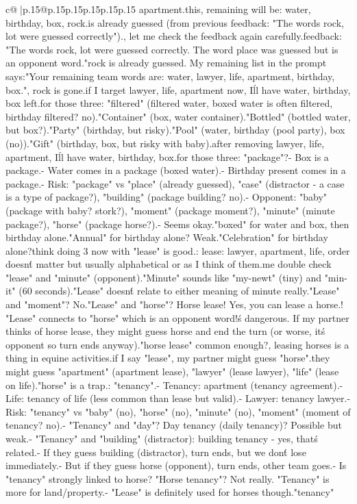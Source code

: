 \documentclass{article}
\begin{document}
{\begin{supertabular}{c@{$\;$}|p{.15\linewidth}@{}p{.15\linewidth}p{.15\linewidth}p{.15\linewidth}p{.15\linewidth}p{.15\linewidth}}
{{{apartment.\n\nAfter this, remaining will be: water, birthday, box, rock.\nRock is already guessed (from previous feedback: "The words rock, lot were guessed correctly").\nWait, let me check the feedback again carefully.\n\nPrevious feedback: "The words rock, lot were guessed correctly. The word place was guessed but is an opponent word."\n\nSo rock is already guessed. My remaining list in the prompt says:\n"Your remaining team words are: water, lawyer, life, apartment, birthday, box."\n\nYes, rock is gone.\n\nSo if I target lawyer, life, apartment now, I\'ll have water, birthday, box left.\n\nThen for those three: "filtered" (filtered water, boxed water is often filtered, birthday filtered? no).\n"Container" (box, water container).\n"Bottled" (bottled water, but box?).\n"Party" (birthday, but risky).\n"Pool" (water, birthday (pool party), box (no)).\n"Gift" (birthday, box, but risky with baby).\n\nActually after removing lawyer, life, apartment, I\'ll have water, birthday, box.\n\nClue for those three: "package"?\n- Box is a package.\n- Water comes in a package (boxed water).\n- Birthday present comes in a package.\n- Risk: "package" vs "place" (already guessed), "case" (distractor - a case is a type of package?), "building" (package building? no).\n- Opponent: "baby" (package with baby? stork?), "moment" (package moment?), "minute" (minute package?), "horse" (package horse?).\n- Seems okay.\n\nOr "boxed" for water and box, then birthday alone.\n"Annual" for birthday alone? Weak.\n\n"Celebration" for birthday alone?\n\nI think doing 3 now with "lease" is good.\n\nCLUE: lease\nTARGETS: lawyer, apartment, life\n\nWait, order doesn\'t matter but usually alphabetical or as I think of them.\n\nLet me double check "lease" and "minute" (opponent).\n"Minute" sounds like "my-newt" (tiny) and "min-it" (60 seconds).\n"Lease" doesn\'t relate to either meaning of minute really.\n\n"Lease" and "moment"? No.\n\n"Lease" and "horse"? Horse lease! Yes, you can lease a horse.\nOh! "Lease" connects to "horse" which is an opponent word!\nThat\'s dangerous. If my partner thinks of horse lease, they might guess horse and end the turn (or worse, it\'s opponent so turn ends anyway).\n\nIs "horse lease" common enough?\nYes, leasing horses is a thing in equine activities.\nSo if I say "lease", my partner might guess "horse".\nOr they might guess "apartment" (apartment lease), "lawyer" (lease lawyer), "life" (lease on life).\nBut "horse" is a trap.\n\nAlternative: "tenancy".\n- Tenancy: apartment (tenancy agreement).\n- Life: tenancy of life (less common than lease but valid).\n- Lawyer: tenancy lawyer.\n- Risk: "tenancy" vs "baby" (no), "horse" (no), "minute" (no), "moment" (moment of tenancy? no).\n- "Tenancy" and "day"? Day tenancy (daily tenancy)? Possible but weak.\n- "Tenancy" and "building" (distractor): building tenancy - yes, that\'s related.\n- If they guess building (distractor), turn ends, but we don\'t lose immediately.\n- But if they guess horse (opponent), turn ends, other team goes.\n- Is "tenancy" strongly linked to horse? "Horse tenancy"? Not really. "Tenancy" is more for land/property.\n- "Lease" is definitely used for horses though.\n\nSo "tenancy" }}}
\end{supertabular}}
\end{document}
